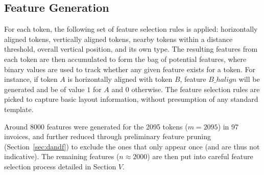 \subsection{Feature Generation}
For each token, the following set of feature selection rules is applied: horizontally aligned tokens, vertically aligned tokens, nearby tokens within a distance threshold, overall vertical position, and its own type. The resulting features from each token are then accumulated to form the bag of potential features, where binary values are used to track whether any given feature exists for a token. For instance, if token $A$ is horizontally aligned with token $B$, feature $B\_halign$ will be generated and be of value $1$ for $A$ and 0 otherwise. The feature selection rules are picked to capture basic layout information, without presumption of any standard template.

Around 8000 features were generated for the 2095 tokens ($m=2095$) in 97 invoices, and further reduced through preliminary feature pruning
(Section~\ref{sec:dandf}) to exclude the ones that only appear once (and are thus not indicative). The remaining features ($n\approx2000$) are then put into careful feature selection process detailed in Section $V$.